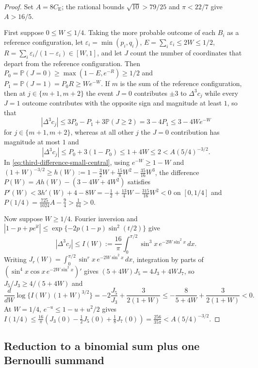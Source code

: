 \documentclass[11pt]{article}
\numberwithin{equation}{section}
\theoremstyle{definition}
\theoremstyle{remark}
\newcommand{\Pp}{\mathbb P}
\newcommand{\be}{C_{\mathrm E}}
\newcommand{\ii}{\mathrm i}
\begin{document}
\begin{proof}
Set $A=8\be$; the rational bounds $\sqrt{10}>79/25$ and $\pi<22/7$ give
$A>16/5$.

First suppose $0\leq W\leq1/4$. Taking the more probable outcome of each $B_i$
as a reference configuration, let $\varepsilon_i=\min(p_i,q_i)$, $E=\sum_i\varepsilon_i\le2W\le1/2$,
$R=\sum_i\varepsilon_i/(1-\varepsilon_i)\in[W,1]$, and let $J$ count the number
of coordinates that depart from the reference configuration. Then
$P_0=\Pp(J=0)\ge\max(1-E,e^{-R})\ge1/2$ and $P_1=\Pp(J=1)=P_0R\ge We^{-W}$.
If $m$ is the sum of the reference configuration, then at $j\in\{m+1,m+2\}$
the event $J=0$ contributes $\pm3$ to $\Delta^3c_j$ while every $J=1$ outcome
contributes with the opposite sign and magnitude at least $1$, so that
\begin{equation}
 |\Delta^3c_j|
 \leq3P_0-P_1+3\Pp(J\geq2)
 =3-4P_1
 \leq3-4We^{-W}
 \label{eq:third-difference-small-central}
\end{equation}
for $j\in\{m+1,m+2\}$, whereas at all other $j$ the $J=0$ contribution has
magnitude at most $1$ and
\begin{equation}
 |\Delta^3c_j|\leq P_0+3(1-P_0)\leq1+4W\le2<A(5/4)^{-3/2}.
 \label{eq:third-difference-small-outer}
\end{equation}
In \eqref{eq:third-difference-small-central}, using $e^{-W}\ge1-W$ and
$(1+W)^{-3/2}\ge h(W):=1-\frac32W+\frac{15}{8}W^2-\frac{35}{16}W^3$, the
difference $P(W)=Ah(W)-(3-4W+4W^2)$ satisfies
$P'(W)<3h'(W)+4-8W=-\frac12+\frac{13}{4}W-\frac{315}{16}W^2<0$ on $[0,1/4]$
and $P(1/4)=\frac{725}{1024}A-\frac94>\frac1{64}>0$.

Now suppose $W\geq1/4$. Fourier inversion and $|1-p+pe^{\ii t}|\leq\exp\{-2p(1-p)\sin^2(t/2)\}$
give
\begin{equation}
 |\Delta^3c_j|
 \leq I(W):=\frac{16}{\pi}\int_0^{\pi/2}
 \sin^3x\,e^{-2W\sin^2x}\,dx.
 \label{eq:third-difference-fourier-majorant}
\end{equation}
Writing $J_r(W)=\int_0^{\pi/2}\sin^rx\,e^{-2W\sin^2x}\,dx$, integration by
parts of $(\sin^4x\cos x\,e^{-2W\sin^2x})'$ gives $(5+4W)J_5=4J_3+4WJ_7$, so
$J_5/J_3\ge4/(5+4W)$ and
\[
 \frac{d}{dW}\log\bigl\{I(W)(1+W)^{3/2}\bigr\}
 =-2\frac{J_5}{J_3}+\frac{3}{2(1+W)}
 \leq-\frac8{5+4W}+\frac3{2(1+W)}<0.
\]
At $W=1/4$, $e^{-u}\leq1-u+u^2/2$ gives
$I(1/4)\leq\frac{16}{\pi}(J_3(0)-\frac12J_5(0)+\frac18J_7(0))=\frac{256}{35\pi}<A(5/4)^{-3/2}$.
\end{proof}

\subsection{Reduction to a binomial sum plus one Bernoulli summand}
\end{document}

